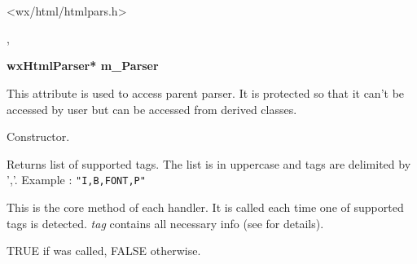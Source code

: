 %
%

\section{}\label{wxhtmltaghandler}




<wx/html/htmlpars.h>


,


\label{wxhtmltaghandlermparser}

{\bf wxHtmlParser* m\_Parser}

This attribute is used to access parent parser. It is protected so that
it can't be accessed by user but can be accessed from derived classes.

\label{wxhtmltaghandlerwxhtmltaghandler}


Constructor.

\label{wxhtmltaghandlergetsupportedtags}


Returns list of supported tags. The list is in uppercase and tags
are delimited by ','. Example : {\tt "I,B,FONT,P" }

\label{wxhtmltaghandlerhandletag}


This is the core method of each handler. It is called each time
one of supported tags is detected. {\it tag} contains all necessary
info (see  for details).


TRUE if  was called,
FALSE otherwise.


